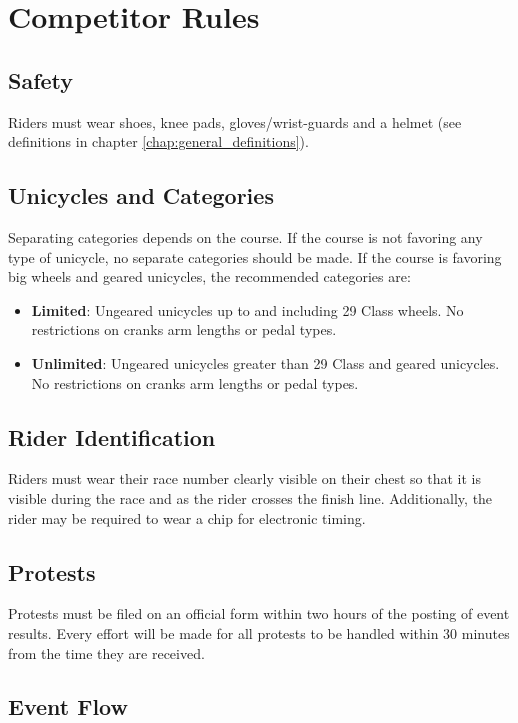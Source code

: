 \chapter{Competitor Rules}

\section{Safety}
Riders must wear shoes, knee pads, gloves/wrist-guards and a helmet (see definitions in chapter \ref{chap:general_definitions}).

\section{Unicycles and Categories}

Separating categories depends on the course.
If the course is not favoring any type of unicycle, no separate categories should be made.
If the course is favoring big wheels and geared unicycles, the recommended categories are:
\begin{itemize}
\item \textbf{Limited}: Ungeared unicycles up to and including 29 Class wheels. No restrictions on cranks arm lengths or pedal types.

\item \textbf{Unlimited}: Ungeared unicycles greater than 29 Class and geared unicycles. No restrictions on cranks arm lengths or pedal types.
\end{itemize}

\section{Rider Identification}

Riders must wear their race number clearly visible on their chest so that it is visible during the race and as the rider crosses the finish line.
Additionally, the rider may be required to wear a chip for electronic timing.

\section{Protests}

Protests must be filed on an official form within two hours of the posting of event results.
Every effort will be made for all protests to be handled within 30 minutes from the time they are received.

\section{Event Flow}

